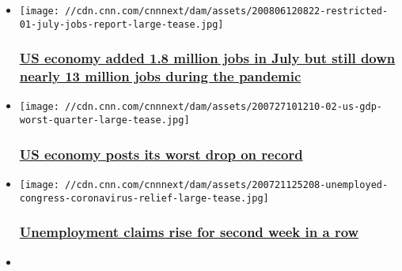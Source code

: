 \begin{itemize}
\item
  \href{/2020/08/07/economy/july-2020-jobs-report/index.html}{}

  \texttt{[image: //cdn.cnn.com/cnnnext/dam/assets/200806120822-restricted-01-july-jobs-report-large-tease.jpg]}

  \hypertarget{us-economy-added-18-million-jobs-in-july-but-still-down-nearly-13-million-jobs-during-the-pandemic}{%
  \subsubsection{\texorpdfstring{\href{/2020/08/07/economy/july-2020-jobs-report/index.html}{US
  economy added 1.8 million jobs in July but still down nearly 13
  million jobs during the
  pandemic}}{US economy added 1.8 million jobs in July but still down nearly 13 million jobs during the pandemic}}\label{us-economy-added-18-million-jobs-in-july-but-still-down-nearly-13-million-jobs-during-the-pandemic}}
\item
  \href{/2020/07/30/economy/us-economy-2020-second-quarter/index.html}{}

  \texttt{[image: //cdn.cnn.com/cnnnext/dam/assets/200727101210-02-us-gdp-worst-quarter-large-tease.jpg]}

  \hypertarget{us-economy-posts-its-worst-drop-on-record}{%
  \subsubsection{\texorpdfstring{\href{/2020/07/30/economy/us-economy-2020-second-quarter/index.html}{US
  economy posts its worst drop on
  record}}{US economy posts its worst drop on record}}\label{us-economy-posts-its-worst-drop-on-record}}
\item
  \href{/2020/07/30/economy/coronavirus-unemployment-benefits/index.html}{}

  \texttt{[image: //cdn.cnn.com/cnnnext/dam/assets/200721125208-unemployed-congress-coronavirus-relief-large-tease.jpg]}

  \hypertarget{unemployment-claims-rise-for-second-week-in-a-row-}{%
  \subsubsection{\texorpdfstring{\href{/2020/07/30/economy/coronavirus-unemployment-benefits/index.html}{Unemployment
  claims rise for second week in a row
  }}{Unemployment claims rise for second week in a row }}\label{unemployment-claims-rise-for-second-week-in-a-row-}}
\item
  \href{/2020/07/27/economy/economy-fiscal-cliff/index.html}{}


\end{itemize}
